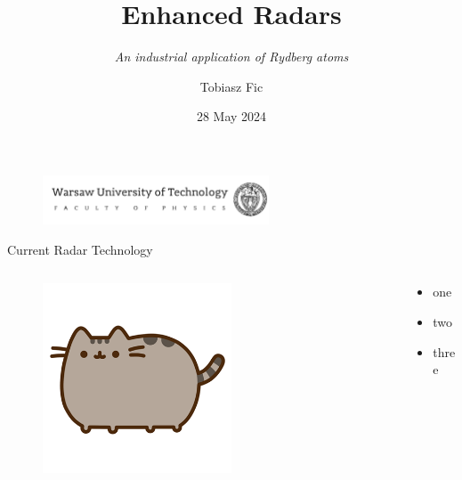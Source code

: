 

\title{Enhanced Radars}
    \subtitle{\textit{An industrial application of Rydberg atoms}}
\author{Tobiasz Fic}
\date{28 May 2024}



\begin{frame}
    \maketitle
    \begin{figure}
        \centering
        \includegraphics[width=0.6\textwidth]{images/logo_eng.png}
    \end{figure}
\end{frame}

\begin{frame}{Current Radar Technology}
    \begin{columns}
        \begin{column}{0.5\textwidth}
            \begin{figure}
                \centering
                \includegraphics[width=0.6\textwidth]{images/pusheen.png}
            \end{figure}
        \end{column}
        \begin{column}{0.5\textwidth}
            \begin{itemize}
                \item one
                \item two
                \item three
            \end{itemize}
        \end{column}
    \end{columns}
\end{frame}


